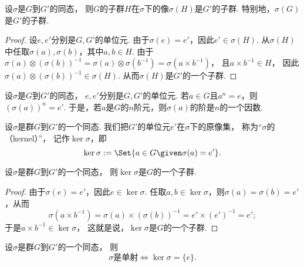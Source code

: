 \begin{property}
设\(\sigma\)是\(G\)到\(G'\)的同态，
则\(G\)的子群\(H\)在\(\sigma\)下的像\(\sigma(H)\)是\(G'\)的子群.
特别地，\(\sigma(G)\)是\(G'\)的子群.
\begin{proof}
设\(e,e'\)分别是\(G,G'\)的单位元.
由于\(\sigma(e)=e'\)，因此\(e'\in\sigma(H)\).
从\(\sigma(H)\)中任取\(\sigma(a),\sigma(b)\)，其中\(a,b\in H\).
由于\(\sigma(a) \otimes (\sigma(b))^{-1}
= \sigma(a) \otimes \sigma(b^{-1})
= \sigma(a \times b^{-1})\)，
且\(a \times b^{-1} \in H\)，
因此\(\sigma(a) \otimes (\sigma(b))^{-1} \in \sigma(H)\).
从而\(\sigma(H)\)是\(G'\)的一个子群.
\end{proof}
\end{property}

\begin{property}
设\(\sigma\)是\(G\)到\(G'\)的同态，
\(e,e'\)分别是\(G,G'\)的单位元.
若\(a \in G\)且\(a^n = e\)，则\((\sigma(a))^n = e'\).
于是，若\(a\)是\(G\)的\(n\)阶元，则\(\sigma(a)\)的阶是\(n\)的一个因数.
\end{property}

\begin{definition}
设\(\sigma\)是群\(G\)到\(G'\)的一个同态.
我们把\(G'\)的单位元\(e'\)在\(\sigma\)下的原像集，
称为“\(\sigma\)的（kernel）”，
记作\(\ker\sigma\)，即\begin{equation*}
	\ker\sigma \defeq \Set{ a \in G \given \sigma(a) = e' }.
\end{equation*}
\end{definition}

\begin{proposition}
设\(\sigma\)是群\(G\)到\(G'\)的一个同态，
则\(\ker\sigma\)是\(G\)的一个子群.
\begin{proof}
由于\(\sigma(e)=e'\)，因此\(e\in\ker\sigma\).
任取\(a,b\in\ker\sigma\)，则\(\sigma(a)=\sigma(b)=e'\)，从而\begin{equation*}
	\sigma(a \times b^{-1}) = \sigma(a) \times (\sigma(b))^{-1}
	= e' \times (e')^{-1}
	= e';
\end{equation*}
于是\(a \times b^{-1} \in \ker\sigma\)，
这就是说，\(\ker\sigma\)是\(G\)的一个子群.
\end{proof}
\end{proposition}

\begin{proposition}
设\(\sigma\)是群\(G\)到\(G'\)的一个同态，
则\begin{equation*}
	\text{\(\sigma\)是单射}
	\iff
	\ker\sigma=\{e\}.
\end{equation*}
\end{proposition}


